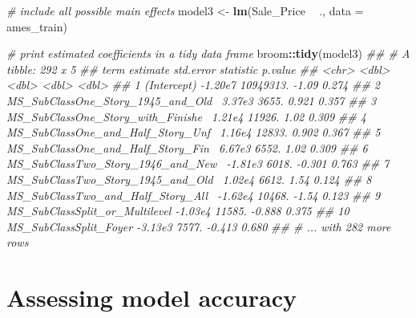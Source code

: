 \documentclass[]{krantz}
\makeatletter
\newenvironment{Shaded}{\begin{snugshade}}{\end{snugshade}}
\newcommand{\CommentTok}[1]{\textcolor[rgb]{0.37,0.37,0.37}{\textit{#1}}}
\newcommand{\DataTypeTok}[1]{\textcolor[rgb]{0.27,0.27,0.27}{#1}}
\newcommand{\KeywordTok}[1]{\textcolor[rgb]{0.27,0.27,0.27}{\textbf{#1}}}
\newcommand{\NormalTok}[1]{#1}
\newcommand{\OperatorTok}[1]{\textcolor[rgb]{0.43,0.43,0.43}{\textbf{#1}}}
\newcommand{\StringTok}[1]{\textcolor[rgb]{0.5,0.5,0.5}{#1}}
\newenvironment{kframe}{%
\medskip{}
\setlength{\fboxsep}{.8em}
 \def\at@end@of@kframe{}%
 \ifinner\ifhmode%
  \def\at@end@of@kframe{\end{minipage}}%
  \begin{minipage}{\columnwidth}%
 \fi\fi%
 \def\FrameCommand##1{\hskip\@totalleftmargin \hskip-\fboxsep
 \colorbox{shadecolor}{##1}\hskip-\fboxsep
     \hskip-\linewidth \hskip-\@totalleftmargin \hskip\columnwidth}%
 \MakeFramed {\advance\hsize-\width
   \@totalleftmargin\z@ \linewidth\hsize
   \@setminipage}}%
 {\par\unskip\endMakeFramed%
 \at@end@of@kframe}
\renewenvironment{Shaded}{\begin{kframe}}{\end{kframe}}
\makeatother
\begin{document}
\begin{Shaded}
\begin{Highlighting}[]
\CommentTok{# include all possible main effects}
\NormalTok{model3 <-}\StringTok{ }\KeywordTok{lm}\NormalTok{(Sale_Price }\OperatorTok{~}\StringTok{ }\NormalTok{., }\DataTypeTok{data =}\NormalTok{ ames_train) }

\CommentTok{# print estimated coefficients in a tidy data frame}
\NormalTok{broom}\OperatorTok{::}\KeywordTok{tidy}\NormalTok{(model3)  }
\CommentTok{## # A tibble: 292 x 5}
\CommentTok{##    term                                estimate std.error statistic p.value}
\CommentTok{##    <chr>                                  <dbl>     <dbl>     <dbl>   <dbl>}
\CommentTok{##  1 (Intercept)                          -1.20e7 10949313.    -1.09    0.274}
\CommentTok{##  2 MS_SubClassOne_Story_1945_and_Old~    3.37e3     3655.     0.921   0.357}
\CommentTok{##  3 MS_SubClassOne_Story_with_Finishe~    1.21e4    11926.     1.02    0.309}
\CommentTok{##  4 MS_SubClassOne_and_Half_Story_Unf~    1.16e4    12833.     0.902   0.367}
\CommentTok{##  5 MS_SubClassOne_and_Half_Story_Fin~    6.67e3     6552.     1.02    0.309}
\CommentTok{##  6 MS_SubClassTwo_Story_1946_and_New~   -1.81e3     6018.    -0.301   0.763}
\CommentTok{##  7 MS_SubClassTwo_Story_1945_and_Old~    1.02e4     6612.     1.54    0.124}
\CommentTok{##  8 MS_SubClassTwo_and_Half_Story_All~   -1.62e4    10468.    -1.54    0.123}
\CommentTok{##  9 MS_SubClassSplit_or_Multilevel       -1.03e4    11585.    -0.888   0.375}
\CommentTok{## 10 MS_SubClassSplit_Foyer               -3.13e3     7577.    -0.413   0.680}
\CommentTok{## # ... with 282 more rows}
\end{Highlighting}
\end{Shaded}

\hypertarget{assessing-model-accuracy}{%
\section{Assessing model accuracy}\label{assessing-model-accuracy}}
\end{document}
